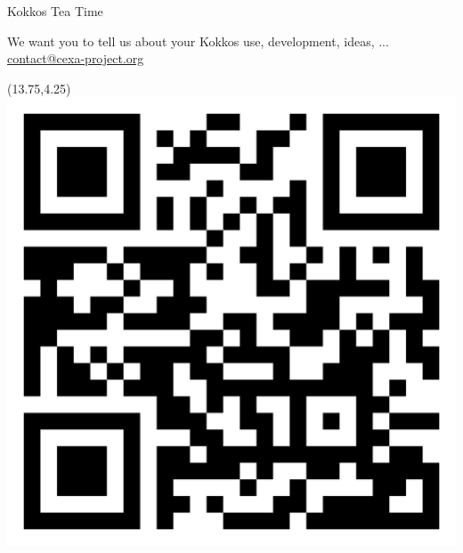 \begin{frame}[fragile]{Kokkos Tea Time}
\begin{textblock}{4.5}
We want you to tell us about your Kokkos use, development, ideas, ...\\
{\small\url{contact@cexa-project.org}}
\end{textblock}
\begin{textblock}{1.5}(13.75,4.25)
\includegraphics[width=\textwidth]{4_3/tea-time-QR}
\end{textblock}
\end{frame}


